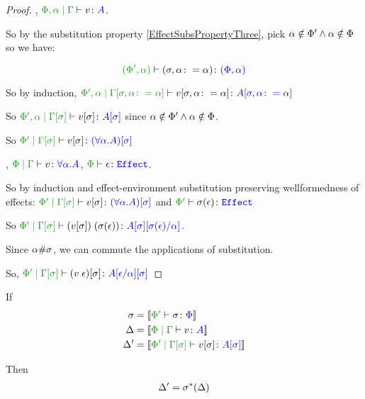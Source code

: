 \documentclass{report}
\begin{document}
\begin{framed}
\begin{proof}
    \case{\vgen}
    \bi, $\etyperelation{\P,\a}{\G}{v}{A}$.
    
    So by the substitution property \ref{EffectSubsPropertyThree}, pick $\alpha\notin\Phi'\wedge\alpha\notin\Phi$ so we have:
    
    $$\typerelation{(\P',\a)}{(\si, \a\setto\a)}{(\P,\a)}$$
    
    So by induction, $\etyperelation{\P', \a}{\G\sub{\si, \a\setto\a}}{v\sub{\si,\a\setto\a}}{A\sub{\si, \a\setto\a}}$
    
    So $\etyperelation{\P',\a}{\G\ssi}{v\ssi}{A\ssi}$ since $\alpha\notin\Phi' \wedge\alpha\notin\Phi$.
    
    So $\etyperelation{\P'}{\G\ssi}{v\ssi}{(\all{\a}{A})\ssi}$
    
    \case{\vspec}
    \bi, $\gpetyperelation{v}{\all{\a}{A}}$, $\wellformede{\P}{\e}$.
    
    So by induction and effect-environment substitution preserving wellformedness of effects: $\etyperelation{\P'}{\G\ssi}{v\ssi}{(\all{\a}{A})\ssi}$ and $\wellformede{\P'}{\si(\e)}$
    
    So $\etyperelation{\P'}{\G\ssi}{\eapp{(v\ssi)}{(\si(\e))}}{A\ssi\ssub{\a}{\si(\e)}}$.
    
    Since $\alpha\#\sigma$, we can commute the applications of substitution.
    
    So, $\etyperelation{\P'}{\G\ssi}{(\eapp{v}{\e})\ssi}{A\ssub{\a}{\e}\ssi}$
    
    \end{proof}
\end{framed}

\begin{theorem}
    
If 
\begin{align*}
    \si &= \deno{\typerelation{\P'}{\si}{\P}}\\
    \D &= \deno{\gpetyperelation{v}{A}}\\
    \D' &= \deno{\etyperelation{\P'}{\G\ssi}{v\ssi}{A\ssi}}\\
\end{align*}

Then \begin{eqnarray}
    \Delta' = \sigma^*(\Delta)
\end{eqnarray}
\end{theorem}
\end{document}
